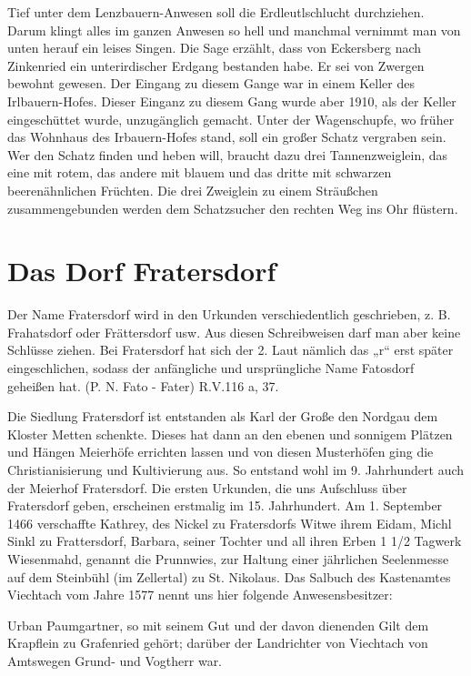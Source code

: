 \documentclass[12pt,a4pager]{book}
\begin{document}
Tief unter dem Lenzbauern-Anwesen soll die Erdleutlschlucht durchziehen. Darum
klingt alles im ganzen Anwesen so hell und manchmal vernimmt man von unten
herauf ein leises Singen. Die Sage erzählt, dass von Eckersberg nach Zinkenried
ein unterirdischer Erdgang bestanden habe. Er sei von Zwergen bewohnt gewesen.
Der Eingang zu diesem Gange war in einem Keller des Irlbauern-Hofes. Dieser
Einganz zu diesem Gang wurde aber 1910, als der Keller eingeschüttet wurde,
unzugänglich gemacht. Unter der Wagenschupfe, wo früher das Wohnhaus des
Irbauern-Hofes stand, soll ein großer Schatz vergraben sein. Wer den Schatz
finden und heben will, braucht dazu drei Tannenzweiglein, das eine mit rotem,
das andere mit blauem und das dritte mit schwarzen beerenähnlichen Früchten. Die
drei Zweiglein zu einem Sträußchen zusammengebunden werden dem Schatzsucher den
rechten Weg ins Ohr flüstern.

\section{Das Dorf Fratersdorf}

Der Name Fratersdorf wird in den Urkunden verschiedentlich geschrieben, z. B.
Frahatsdorf oder Frättersdorf usw. Aus diesen Schreibweisen darf man aber keine
Schlüsse ziehen. Bei Fratersdorf hat sich der 2. Laut nämlich das „r“ erst
später eingeschlichen, sodass der anfängliche und ursprüngliche Name Fatosdorf
geheißen hat. (P. N. Fato - Fater) R.V.116 a, 37.

Die Siedlung Fratersdorf ist entstanden als Karl der Große den Nordgau dem
Kloster Metten schenkte. Dieses hat dann an den ebenen und sonnigem Plätzen und
Hängen Meierhöfe errichten lassen und von diesen Musterhöfen ging die
Christianisierung und Kultivierung aus. So entstand wohl im 9. Jahrhundert auch
der Meierhof Fratersdorf. Die ersten Urkunden, die uns Aufschluss über
Fratersdorf geben, erscheinen erstmalig im 15. Jahrhundert. Am 1. September 1466
verschaffte Kathrey, des Nickel zu Fratersdorfs Witwe ihrem Eidam, Michl Sinkl
zu Frattersdorf, Barbara, seiner Tochter und all ihren Erben 1 1/2 Tagwerk
Wiesenmahd, genannt die Prunnwies, zur Haltung einer jährlichen Seelenmesse auf
dem Steinbühl (im Zellertal) zu St. Nikolaus. Das Salbuch des Kastenamtes
Viechtach vom Jahre 1577 nennt uns hier folgende Anwesensbesitzer:

Urban Paumgartner, so mit seinem Gut und der davon dienenden Gilt dem Krapflein
zu Grafenried gehört; darüber der Landrichter von Viechtach von Amtswegen Grund-
und Vogtherr war.
\end{document}
